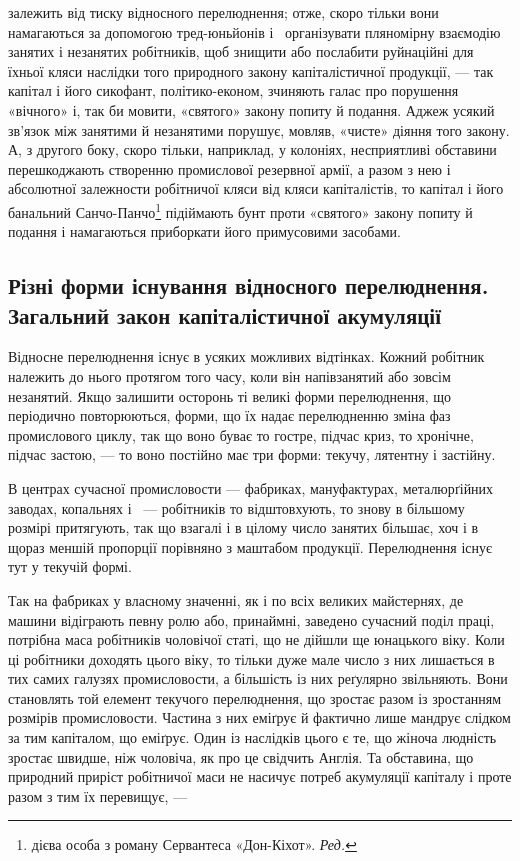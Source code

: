 \parcont{}  %
залежить від тиску відносного перелюднення; отже, скоро тільки вони намагаються за допомогою
тред-юньйонів і~ організувати пляномірну взаємодію занятих і незанятих робітників, щоб знищити
або послабити руйнаційні для їхньої кляси наслідки того природного закону капіталістичної
продукції, — так капітал і його сикофант, політико-економ, зчиняють галас про порушення «вічного» і, так би
мовити, «святого» закону попиту й подання. Аджеж усякий зв’язок між занятими й незанятими
порушує, мовляв, «чисте» діяння того закону. А, з другого боку, скоро тільки, наприклад, у колоніях,
несприятливі обставини перешкоджають створенню промислової резервної армії, а разом з нею і
абсолютної залежности робітничої кляси від кляси капіталістів, то капітал і його банальний
Санчо-Панчо\footnote*{
дієва особа з роману Сервантеса «Дон-Кіхот». \emph{Ред.}
} підіймають
бунт проти «святого» закону попиту й подання і намагаються приборкати його примусовими засобами.

\subsection{Різні форми існування відносного перелюднення. Загальний закон капіталістичної акумуляції}

Відносне перелюднення існує в усяких можливих відтінках. Кожний робітник належить до нього протягом
того часу, коли він напівзанятий або зовсім незанятий. Якщо залишити осторонь ті великі форми
перелюднення, що періодично повторюються,
форми, що їх надає перелюдненню зміна фаз промислового циклу, так що воно буває то гостре, підчас
криз, то хронічне, підчас застою, — то воно постійно має три форми: текучу, лятентну і застійну.

В центрах сучасної промисловости — фабриках, мануфактурах, металюрґійних заводах, копальнях і~
— робітників то відштовхують, то знову в більшому розмірі притягують, так що взагалі і в цілому
число занятих більшає, хоч і в щораз
меншій пропорції порівняно з маштабом продукції. Перелюднення існує тут у текучій формі.

Так на фабриках у власному значенні, як і по всіх великих майстернях, де машини відіграють певну
ролю або, принаймні, заведено сучасний поділ праці, потрібна маса робітників чоловічої статі, що не
дійшли ще юнацького віку. Коли ці робітники доходять цього віку, то тільки дуже мале число з них
лишається в тих самих галузях промисловости, а більшість із них реґулярно звільняють. Вони
становлять той елемент текучого перелюднення, що зростає разом із зростанням розмірів промисловости.
Частина з них еміґрує й фактично лише мандрує слідком за тим капіталом, що еміґрує. Один із
наслідків цього є те, що жіноча людність зростає швидше, ніж чоловіча, як про це свідчить Англія. Та
обставина, що природний приріст робітничої маси не насичує
потреб акумуляції капіталу і проте разом з тим їх перевищує, —
\parbreak{}  %
